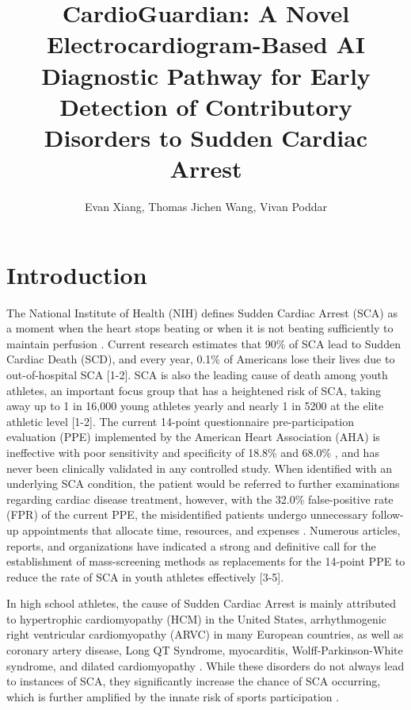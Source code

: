 \documentclass[
	a4paper, 
	10pt, 
	twoside, 
]{LTJournalArticle}
\title{CardioGuardian: A Novel Electrocardiogram-Based AI Diagnostic Pathway for Early Detection of Contributory Disorders to Sudden Cardiac Arrest} %
\author{%
	Evan Xiang, Thomas Jichen Wang, Vivan Poddar
}
\date{}
\begin{document}
\maketitle %

\section{Introduction}
The National Institute of Health (NIH) defines Sudden Cardiac Arrest (SCA) as a moment when the heart stops beating or when it is not beating sufficiently to maintain perfusion \autocite{Yow2022-cc}. Current research estimates that 90\% of SCA lead to Sudden Cardiac Death (SCD), and every year, 0.1\% of Americans lose their lives due to out-of-hospital SCA [1-2]. SCA is also the leading cause of death among youth athletes, an important focus group that has a heightened risk of SCA, taking away up to 1 in 16,000 young athletes yearly and nearly 1 in 5200 at the elite athletic level [1-2]. The current 14-point questionnaire pre-participation evaluation (PPE) implemented by the American Heart Association (AHA) is ineffective with poor sensitivity and specificity of 18.8\% and 68.0\% \cite{Williams2019}, and has never been clinically validated in any controlled study. When identified with an underlying SCA condition, the patient would be referred to further examinations regarding cardiac disease treatment, however, with the 32.0\% false-positive rate (FPR) of the current PPE, the misidentified patients undergo unnecessary follow-up appointments that allocate time, resources, and expenses \cite{Williams2019}. Numerous articles, reports, and organizations have indicated a strong and definitive call for the establishment of mass-screening methods as replacements for the 14-point PPE to reduce the rate of SCA in youth athletes effectively [3-5].

In high school athletes, the cause of Sudden Cardiac Arrest is mainly attributed to hypertrophic cardiomyopathy (HCM) in the United States, arrhythmogenic right ventricular cardiomyopathy (ARVC) in many European countries, as well as coronary artery disease, Long QT Syndrome, myocarditis, Wolff-Parkinson-White syndrome, and dilated cardiomyopathy \cite{Yow2022-cc}\cite{Ha2022}. While these disorders do not always lead to instances of SCA, they significantly increase the chance of SCA occurring, which is further amplified by the innate risk of sports participation \cite{Saul2010}. 
\end{document}
